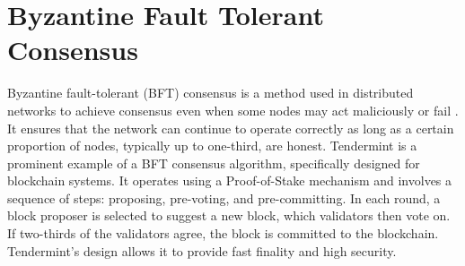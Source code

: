\documentclass[11pt]{article}
\begin{document}
\section{Byzantine Fault Tolerant Consensus}
Byzantine fault-tolerant (BFT) consensus is a method used in distributed networks to achieve consensus even when some nodes may act maliciously or fail \cite{cachin/1972495}. It ensures that the network can continue to operate correctly as long as a certain proportion of nodes, typically up to one-third, are honest. Tendermint \cite{Buchman18} is a prominent example of a BFT consensus algorithm, specifically designed for blockchain systems. It operates using a Proof-of-Stake mechanism and involves a sequence of steps: proposing, pre-voting, and pre-committing. In each round, a block proposer is selected to suggest a new block, which validators then vote on. If two-thirds of the validators agree, the block is committed to the blockchain. Tendermint’s design allows it to provide fast finality and high security.
\end{document}
